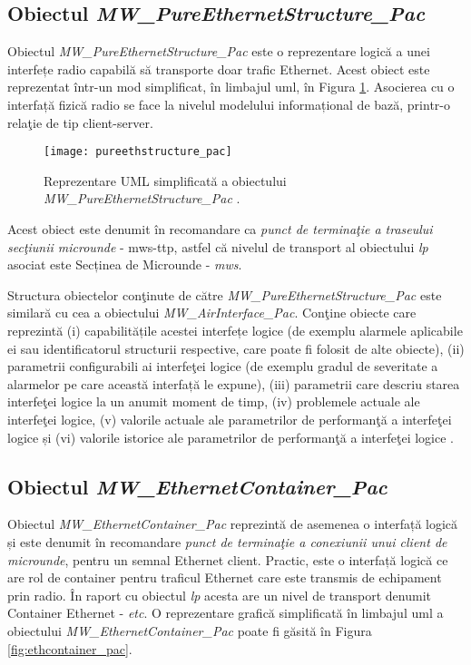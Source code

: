 \subsection{Obiectul \textit{MW\_PureEthernetStructure\_Pac}}

Obiectul \textit{MW\_PureEthernetStructure\_Pac} este o reprezentare logică a unei interfețe radio capabilă să transporte doar trafic Ethernet. Acest obiect este reprezentat într-un mod simplificat, în limbajul \gls{uml}, în Figura \ref{fig:pureethstructure_pac}. Asocierea cu o interfață fizică radio se face la nivelul modelului informațional de bază, printr-o relaţie de tip client-server.

\begin{figure}[h]
	\centering
	\texttt{[image: pureethstructure\_pac]}
	\caption{Reprezentare UML simplificată a obiectului \textit{MW\_PureEthernetStructure\_Pac} \cite{onftr532}.}
	\label{fig:pureethstructure_pac}
\end{figure}

Acest obiect este denumit în recomandare ca \textit{punct de terminaţie a traseului secţiunii microunde} - \gls{mws-ttp}, astfel că nivelul de transport al obiectului \textit{\gls{lp}} asociat este Secținea de Microunde - \textit{\gls{mws}}. 

Structura obiectelor conţinute de către \textit{MW\_PureEthernetStructure\_Pac} este similară cu cea a obiectului \textit{MW\_AirInterface\_Pac}. Conţine obiecte care reprezintă (i) capabilitățile acestei interfețe logice (de exemplu alarmele aplicabile ei sau identificatorul structurii respective, care poate fi folosit de alte obiecte), (ii) parametrii configurabili ai interfeţei logice (de exemplu gradul de severitate a alarmelor pe care această interfață le expune), (iii) parametrii care descriu starea interfeţei logice la un anumit moment de timp, (iv) problemele actuale ale interfeţei logice, (v) valorile actuale ale parametrilor de performanţă a interfeţei logice și (vi) valorile istorice ale parametrilor de performanţă a interfeţei logice \cite{onftr532}.

\subsection{Obiectul \textit{MW\_EthernetContainer\_Pac}}

Obiectul \textit{MW\_EthernetContainer\_Pac} reprezintă de asemenea o interfață logică și este denumit în recomandare \textit{punct de terminaţie a conexiunii unui client de microunde}, pentru un semnal Ethernet client. Practic, este o interfață logică ce are rol de container pentru traficul Ethernet care este transmis de echipament prin radio. În raport cu obiectul \textit{\gls{lp}} acesta are un nivel de transport denumit Container Ethernet - \textit{\gls{etc}}. O reprezentare grafică simplificată în limbajul \gls{uml} a obiectului \textit{MW\_EthernetContainer\_Pac} poate fi găsită în Figura \ref{fig:ethcontainer_pac}.

